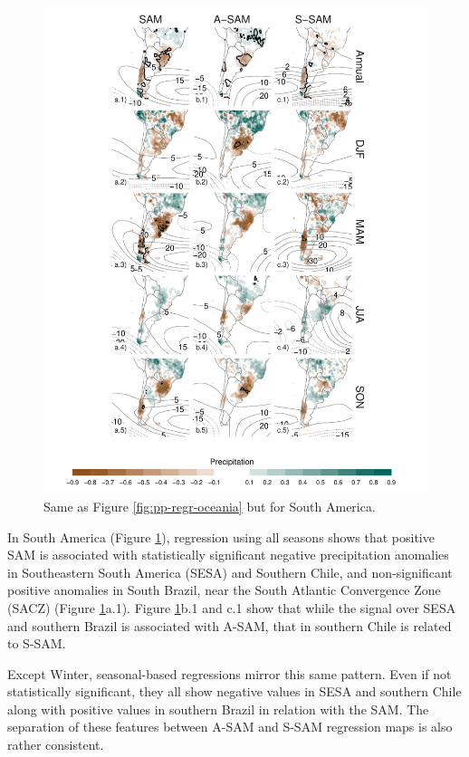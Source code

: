 \documentclass[smallextended]{svjour3}       %
\begin{document}
\begin{figure}
\includegraphics{pp-regr-america-1} \caption{Same as Figure \ref{fig:pp-regr-oceania} but for South America.}\label{fig:pp-regr-america}
\end{figure}

In South America (Figure \ref{fig:pp-regr-america}), regression using all seasons shows that positive SAM is associated with statistically significant negative precipitation anomalies in Southeastern South America (SESA) and Southern Chile, and non-significant positive anomalies in South Brazil, near the South Atlantic Convergence Zone (SACZ) (Figure \ref{fig:pp-regr-america}a.1). Figure \ref{fig:pp-regr-america}b.1 and c.1 show that while the signal over SESA and southern Brazil is associated with A\nobreakdash-SAM, that in southern Chile is related to S\nobreakdash-SAM.

Except Winter, seasonal-based regressions mirror this same pattern. Even if not statistically significant, they all show negative values in SESA and southern Chile along with positive values in southern Brazil in relation with the SAM. The separation of these features between A\nobreakdash-SAM and S\nobreakdash-SAM regression maps is also rather consistent.
\end{document}
